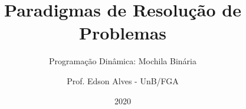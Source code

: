 \title{Paradigmas de Resolução de Problemas}
\subtitle{Programação Dinâmica: Mochila Binária}
\author{Prof. Edson Alves - UnB/FGA}
\date{2020}
